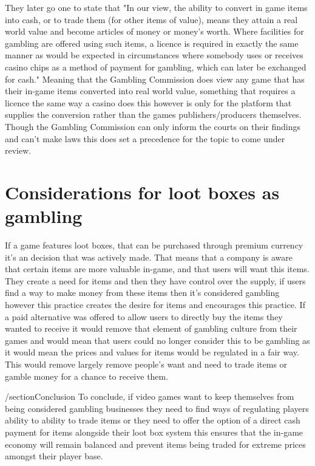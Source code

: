 \documentclass{scrartcl}
\begin{document}
They later go one to state that "In our view, the ability to convert in game items into cash, or to trade them (for other items of value), means they attain a real world value and become articles of money or money’s worth. Where facilities for gambling are offered using such items, a licence is required in exactly the same manner as would be expected in circumstances where somebody uses or receives casino chips as a method of payment for gambling, which can later be exchanged for cash." Meaning that the Gambling Commission does view any game that has their in-game items converted into real world value, something that requires a licence the same way a casino does this however is only for the platform that supplies the conversion rather than the games publishers/producers themselves. Though the Gambling Commission can only inform the courts on their findings and can't make laws this does set a precedence for the topic to come under review.

\section{Considerations for loot boxes as gambling}
If a game features loot boxes, that can be purchased through premium currency it's an decision that was actively made. That means that a company is aware that certain items are more valuable in-game, and that users will want this items. They create a need for items and then they have control over the supply, if users find a way to make money from these items then it's considered gambling however this practice creates the desire for items and encourages this practice. If a paid alternative was offered to allow users to directly buy the items they wanted to receive it would remove that element of gambling culture from their games and would mean that users could no longer consider this to be gambling as it would mean the prices and values for items would be regulated in a fair way. This would remove largely remove people's want and need to trade items or gamble money for a chance to receive them.

/section{Conclusion}
To conclude, if video games want to keep themselves from being considered gambling businesses they need to find ways of regulating players ability to ability to trade items or they need to offer the option of a direct cash payment for items alongside their loot box system this ensures that the in-game economy will remain balanced and prevent items being traded for extreme prices amongst their player base.



\end{document}

